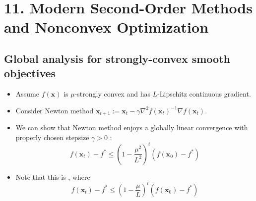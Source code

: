 \section*{11. Modern Second-Order Methods and Nonconvex Optimization}


\subsection*{Global analysis for strongly-convex smooth objectives}
\begin{itemize}[leftmargin=*]
    \item Assume $f(\mathbf{x})$ is $\mu$-strongly convex and has $L$-Lipschitz continuous gradient.
    \item Consider Newton method $\mathbf{x}_{t+1}:=\mathbf{x}_{t}-\gamma \nabla^{2} f\left(\mathbf{x}_{t}\right)^{-1} \nabla f\left(\mathbf{x}_{t}\right)$.
    \item We can show that Newton method enjoys a globally linear convergence with properly chosen stepsize $\gamma>0$ :
$$
f\left(\mathbf{x}_{t}\right)-f^{*} \leq\left(1-\frac{\mu^{2}}{L^{2}}\right)^{t}\left(f\left(\mathbf{x}_{0}\right)-f^{*}\right)
$$
    \item Note that this is , where
$$
f\left(\mathbf{x}_{t}\right)-f^{*} \leq\left(1-\frac{\mu}{L}\right)^{t}\left(f\left(\mathbf{x}_{0}\right)-f^{*}\right)
$$
\end{itemize}







